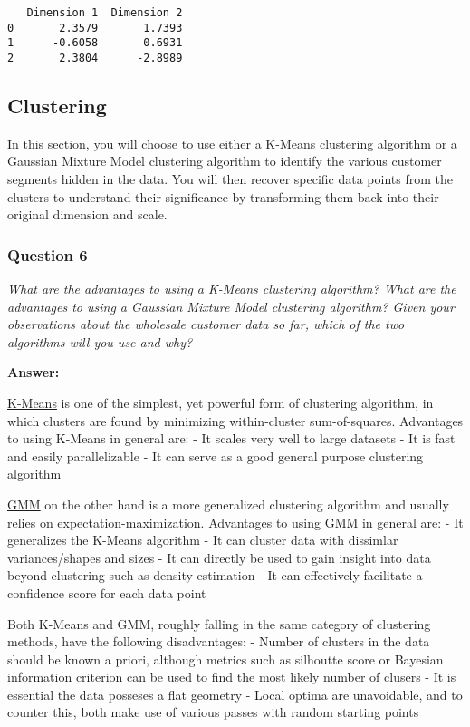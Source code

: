 \documentclass{article}
\begin{document}
    
    \begin{verbatim}
   Dimension 1  Dimension 2
0       2.3579       1.7393
1      -0.6058       0.6931
2       2.3804      -2.8989
    \end{verbatim}

    
    \subsection{Clustering}\label{clustering}

In this section, you will choose to use either a K-Means clustering
algorithm or a Gaussian Mixture Model clustering algorithm to identify
the various customer segments hidden in the data. You will then recover
specific data points from the clusters to understand their significance
by transforming them back into their original dimension and scale.

    \subsubsection{Question 6}\label{question-6}

\emph{What are the advantages to using a K-Means clustering algorithm?
What are the advantages to using a Gaussian Mixture Model clustering
algorithm? Given your observations about the wholesale customer data so
far, which of the two algorithms will you use and why?}

    \textbf{Answer:}

\href{http://scikit-learn.org/stable/modules/clustering.html\#k-means}{K-Means}
is one of the simplest, yet powerful form of clustering algorithm, in
which clusters are found by minimizing within-cluster sum-of-squares.
Advantages to using K-Means in general are: - It scales very well to
large datasets - It is fast and easily parallelizable - It can serve as
a good general purpose clustering algorithm

\href{http://scikit-learn.org/stable/modules/mixture.html\#gmm-classifier}{GMM}
on the other hand is a more generalized clustering algorithm and usually
relies on expectation-maximization. Advantages to using GMM in general
are: - It generalizes the K-Means algorithm - It can cluster data with
dissimlar variances/shapes and sizes - It can directly be used to gain
insight into data beyond clustering such as density estimation - It can
effectively facilitate a confidence score for each data point

Both K-Means and GMM, roughly falling in the same category of clustering
methods, have the following disadvantages: - Number of clusters in the
data should be known a priori, although metrics such as silhoutte score
or Bayesian information criterion can be used to find the most likely
number of clusers - It is essential the data posseses a flat geometry -
Local optima are unavoidable, and to counter this, both make use of
various passes with random starting points
\end{document}
